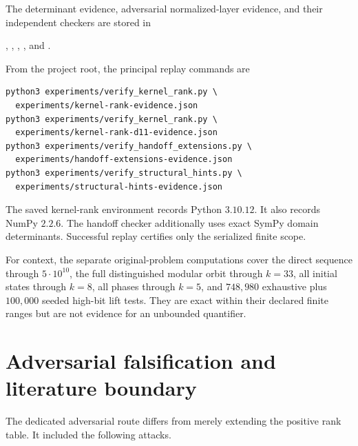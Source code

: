 \documentclass[11pt]{amsart}
\theoremstyle{definition}
\begin{document}
The determinant evidence, adversarial normalized-layer evidence, and their
independent checkers are stored in
\begin{center}
\begin{minipage}{0.94\textwidth}
\small
{},
,
,
, and
.
\end{minipage}
\end{center}
From the project root, the principal replay commands are
\begin{verbatim}
python3 experiments/verify_kernel_rank.py \
  experiments/kernel-rank-evidence.json
python3 experiments/verify_kernel_rank.py \
  experiments/kernel-rank-d11-evidence.json
python3 experiments/verify_handoff_extensions.py \
  experiments/handoff-extensions-evidence.json
python3 experiments/verify_structural_hints.py \
  experiments/structural-hints-evidence.json
\end{verbatim}
The saved kernel-rank environment records Python $3.10.12$.  It also records
NumPy $2.2.6$.  The handoff checker additionally uses exact SymPy domain
determinants.  Successful replay certifies only the serialized finite scope.

For context, the separate original-problem computations cover the direct
sequence through $5\cdot10^{10}$, the full distinguished modular orbit through
$k=33$, all initial states through $k=8$, all phases through $k=5$, and
$748{,}980$ exhaustive plus $100{,}000$ seeded high-bit lift tests.  They are
exact within their declared finite ranges but are not evidence for an
unbounded quantifier.

\section{Adversarial falsification and literature boundary}

The dedicated adversarial route differs from merely extending the positive
rank table.  It included the following attacks.
\end{document}
